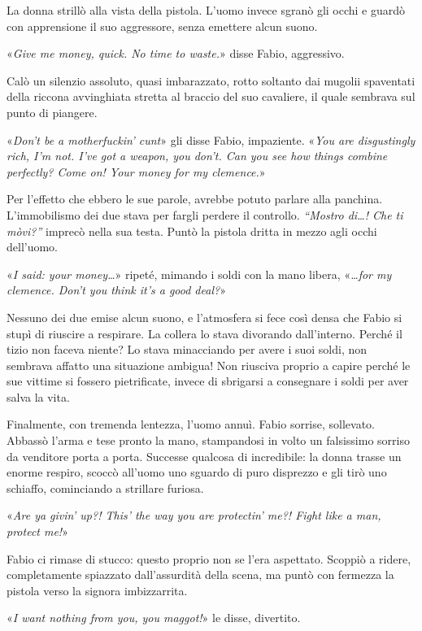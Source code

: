 La donna strillò alla vista della pistola. L'uomo invece sgranò gli occhi e guardò con apprensione il suo aggressore, senza emettere alcun suono.

«\textit{Give me money, quick. No time to waste.}» disse Fabio, aggressivo.

Calò un silenzio assoluto, quasi imbarazzato, rotto soltanto dai mugolii spaventati della riccona avvinghiata stretta al braccio del suo cavaliere, il quale sembrava sul punto di piangere.

«\textit{Don't be a motherfuckin' cunt}» gli disse Fabio, impaziente. «\textit{You are disgustingly rich, I'm not. I've got a weapon, you don't. Can you see how things combine perfectly? Come on! Your money for my clemence.}»

Per l'effetto che ebbero le sue parole, avrebbe potuto parlare alla panchina. L'immobilismo dei due stava per fargli perdere il controllo. \textit{``Mostro di\ldots! Che ti mòvi?''} imprecò nella sua testa. Puntò la pistola dritta in mezzo agli occhi dell'uomo.

«\textit{I said: your money\ldots}» ripeté, mimando i soldi con la mano libera, «\textit{\ldots for my clemence. Don't you think it's a good deal?}»

Nessuno dei due emise alcun suono, e l'atmosfera si fece così densa che Fabio si stupì di riuscire a respirare. La collera lo stava divorando dall'interno. Perché il tizio non faceva niente? Lo stava minacciando per avere i suoi soldi, non sembrava affatto una situazione ambigua! Non riusciva proprio a capire perché le sue vittime si fossero pietrificate, invece di sbrigarsi a consegnare i soldi per aver salva la vita.

Finalmente, con tremenda lentezza, l'uomo annuì. Fabio sorrise, sollevato. Abbassò l'arma e tese pronto la mano, stampandosi in volto un falsissimo sorriso da venditore porta a porta. Successe qualcosa di incredibile: la donna trasse un enorme respiro, scoccò all'uomo uno sguardo di puro disprezzo e gli tirò uno schiaffo, cominciando a strillare furiosa.

«\textit{Are ya givin' up?! This' the way you are protectin' me?! Fight like a man, protect me!}»

Fabio ci rimase di stucco: questo proprio non se l'era aspettato. Scoppiò a ridere, completamente spiazzato dall'assurdità della scena, ma puntò con fermezza la pistola verso la signora imbizzarrita.

«\textit{I want nothing from you, you maggot!}» le disse, divertito.

